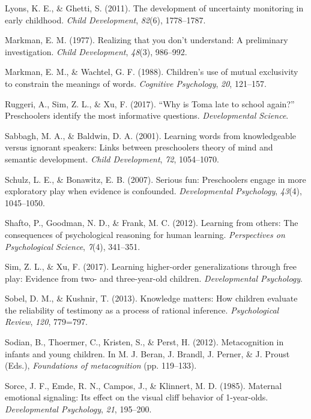 \documentclass[a4paper,man,apacite,floatsintext]{apa6}
\begin{document}
\hypertarget{ref-Lyons2011a}{}
Lyons, K. E., \& Ghetti, S. (2011). The development of uncertainty
monitoring in early childhood. \emph{Child Development}, \emph{82}(6),
1778--1787.

\hypertarget{ref-Markman1977}{}
Markman, E. M. (1977). Realizing that you don't understand: A
preliminary investigation. \emph{Child Development}, \emph{48}(3),
986--992.

\hypertarget{ref-Markman1988}{}
Markman, E. M., \& Wachtel, G. F. (1988). Children's use of mutual
exclusivity to constrain the meanings of words. \emph{Cognitive
Psychology}, \emph{20}, 121--157.

\hypertarget{ref-Ruggeri2017}{}
Ruggeri, A., Sim, Z. L., \& Xu, F. (2017). ``Why is Toma late to school
again?'' Preschoolers identify the most informative questions.
\emph{Developmental Science}.

\hypertarget{ref-Sabbagh2001}{}
Sabbagh, M. A., \& Baldwin, D. A. (2001). Learning words from
knowledgeable versus ignorant speakers: Links between preschoolers
theory of mind and semantic development. \emph{Child Development},
\emph{72}, 1054--1070.

\hypertarget{ref-Schulz2007}{}
Schulz, L. E., \& Bonawitz, E. B. (2007). Serious fun: Preschoolers
engage in more exploratory play when evidence is confounded.
\emph{Developmental Psychology}, \emph{43}(4), 1045--1050.

\hypertarget{ref-Shafto2012}{}
Shafto, P., Goodman, N. D., \& Frank, M. C. (2012). Learning from
others: The consequences of psychological reasoning for human learning.
\emph{Perspectives on Psychological Science}, \emph{7}(4), 341--351.

\hypertarget{ref-Sim2017}{}
Sim, Z. L., \& Xu, F. (2017). Learning higher-order generalizations
through free play: Evidence from two- and three-year-old children.
\emph{Developmental Psychology}.

\hypertarget{ref-Sobel2013}{}
Sobel, D. M., \& Kushnir, T. (2013). Knowledge matters: How children
evaluate the reliability of testimony as a process of rational
inference. \emph{Psychological Review}, \emph{120}, 779=797.

\hypertarget{ref-Sodian2012}{}
Sodian, B., Thoermer, C., Kristen, S., \& Perst, H. (2012).
Metacognition in infants and young children. In M. J. Beran, J. Brandl,
J. Perner, \& J. Proust (Eds.), \emph{Foundations of metacognition} (pp.
119--133).

\hypertarget{ref-Sorce1985}{}
Sorce, J. F., Emde, R. N., Campos, J., \& Klinnert, M. D. (1985).
Maternal emotional signaling: Its effect on the visual cliff behavior of
1-year-olds. \emph{Developmental Psychology}, \emph{21}, 195--200.
\end{document}
